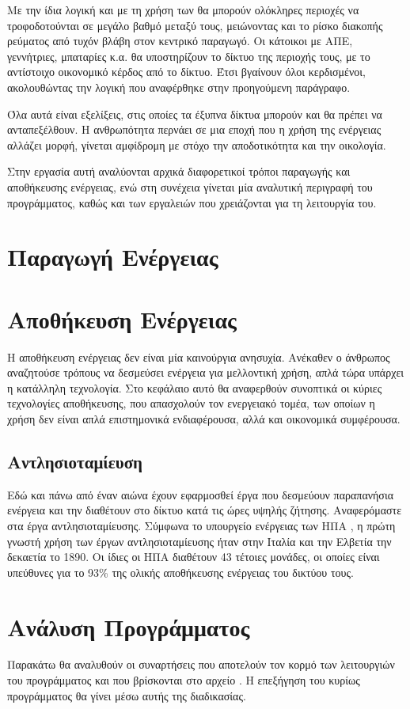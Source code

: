\documentclass[12pt]{report}
\begin{document}
Με την ίδια λογική και με τη χρήση των {} θα μπορούν ολόκληρες περιοχές να τροφοδοτούνται σε μεγάλο βαθμό μεταξύ τους, μειώνοντας και το ρίσκο διακοπής ρεύματος από τυχόν βλάβη στον κεντρικό παραγωγό. 
Οι κάτοικοι με ΑΠΕ, γεννήτριες, μπαταρίες κ.α. θα υποστηρίζουν το δίκτυο της περιοχής τους, με το αντίστοιχο οικονομικό κέρδος από το δίκτυο. Έτσι βγαίνουν όλοι κερδισμένοι, ακολουθώντας την λογική που αναφέρθηκε
στην προηγούμενη παράγραφο.

Όλα αυτά είναι εξελίξεις, στις οποίες τα έξυπνα δίκτυα μπορούν και θα πρέπει να ανταπεξέλθουν. Η ανθρωπότητα περνάει σε μια εποχή που η χρήση της ενέργειας αλλάζει μορφή, γίνεται αμφίδρομη με στόχο την αποδοτικότητα
και την οικολογία.

Στην εργασία αυτή αναλύονται αρχικά διαφορετικοί τρόποι παραγωγής και αποθήκευσης ενέργειας, ενώ στη συνέχεια γίνεται μία αναλυτική περιγραφή του προγράμματος, καθώς και των εργαλειών που χρειάζονται για τη λειτουργία του.
\chapter{Παραγωγή Ενέργειας}
\chapter{Αποθήκευση Ενέργειας}
\label{chap:storage}
Η αποθήκευση ενέργειας δεν είναι μία καινούργια ανησυχία. Ανέκαθεν ο άνθρωπος αναζητούσε τρόπους να δεσμεύσει ενέργεια για μελλοντική χρήση, απλά τώρα υπάρχει η κατάλληλη τεχνολογία. Στο κεφάλαιο αυτό θα αναφερθούν
συνοπτικά οι κύριες τεχνολογίες αποθήκευσης, που απασχολούν τον ενεργειακό τομέα, των οποίων η χρήση δεν είναι απλά επιστημονικά ενδιαφέρουσα, αλλά και οικονομικά συμφέρουσα.
\section{Αντλησιοταμίευση}
Εδώ και πάνω από έναν αιώνα έχουν εφαρμοσθεί έργα που δεσμεύουν παραπανήσια ενέργεια και την διαθέτουν στο δίκτυο κατά τις ώρες υψηλής ζήτησης. Αναφερόμαστε στα έργα αντλησιοταμίευσης. 
Σύμφωνα το υπουργείο ενέργειας των ΗΠΑ \parencite{energygov1801}, η πρώτη γνωστή χρήση των έργων αντλησιοταμίευσης ήταν  στην Ιταλία και την Ελβετία την δεκαετία το 1890. Οι ίδιες οι ΗΠΑ διαθέτουν 43 τέτοιες μονάδες, οι
οποίες είναι υπεύθυνες για το 93\% της ολικής αποθήκευσης ενέργειας του δικτύου τους.
\chapter{Ανάλυση Προγράμματος}
Παρακάτω θα αναλυθούν οι συναρτήσεις που αποτελούν τον κορμό των λειτουργιών του προγράμματος και που βρίσκονται
στο αρχείο {}. Η επεξήγηση του κυρίως προγράμματος {} θα γίνει μέσω αυτής της διαδικασίας.
\end{document}
